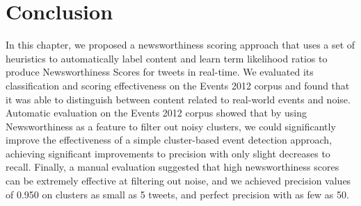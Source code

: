 
\section{Conclusion}
\label{scoring:sec:discussion}

In this chapter, we proposed a newsworthiness scoring approach that uses a set of heuristics to automatically label content and learn term likelihood ratios to produce Newsworthiness Scores for tweets in real-time.
We evaluated its classification and scoring effectiveness on the Events 2012 corpus and found that it was able to distinguish between content related to real-world events and noise.
Automatic evaluation on the Events 2012 corpus showed that by using Newsworthiness as a feature to filter out noisy clusters, we could significantly improve the effectiveness of a simple cluster-based event detection approach, achieving significant improvements to precision with only slight decreases to recall.
Finally, a manual evaluation suggested that high newsworthiness scores can be extremely effective at filtering out noise, and we achieved precision values of 0.950 on clusters as small as 5 tweets, and perfect precision with as few as 50.
